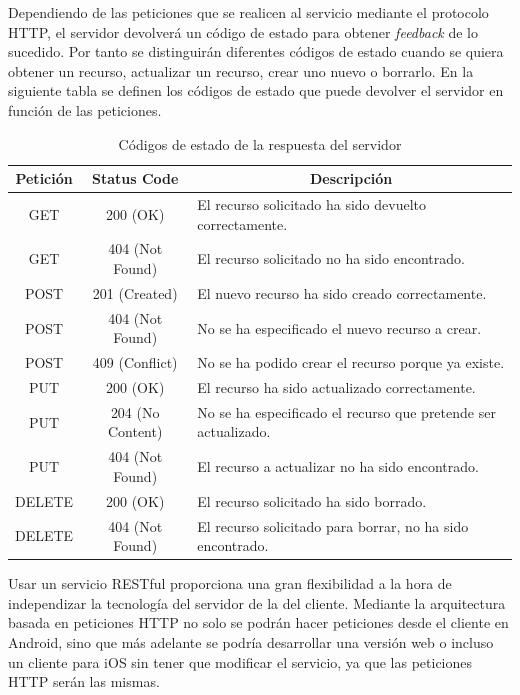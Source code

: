 Dependiendo de las peticiones que se realicen al servicio mediante el protocolo HTTP, el servidor devolverá un código de estado para obtener \textit{feedback} de lo sucedido. Por tanto se distinguirán diferentes códigos de estado cuando se quiera obtener un recurso, actualizar un recurso, crear uno nuevo o borrarlo. En la siguiente tabla se definen los códigos de estado que puede devolver el servidor en función de las peticiones.

\begin{table}[!]
\begin{tabular}{|c|c|m{7.5cm}|}
\hline
{\bf Petición} & {\bf Status Code} & \multicolumn{1}{c|}{{\bf Descripción}}                         \\ \hline
GET            & 200 (OK)          & El recurso solicitado ha sido devuelto correctamente.          \\ \hline
GET            & 404 (Not Found)   & El recurso solicitado no ha sido encontrado.                   \\ \hline
POST           & 201 (Created)     & El nuevo recurso ha sido creado correctamente.                 \\ \hline
POST           & 404 (Not Found)   & No se ha especificado el nuevo recurso a crear.                \\ \hline
POST           & 409 (Conflict)    & No se ha podido crear el recurso porque ya existe.             \\ \hline
PUT            & 200 (OK)          & El recurso ha sido actualizado correctamente.                  \\ \hline
PUT            & 204 (No Content)  & No se ha especificado el recurso que pretende ser actualizado. \\ \hline
PUT            & 404 (Not Found)   & El recurso a actualizar no ha sido encontrado.                 \\ \hline
DELETE         & 200 (OK)          & El recurso solicitado ha sido borrado.                         \\ \hline
DELETE         & 404 (Not Found)   & El recurso solicitado para borrar, no ha sido encontrado.      \\ \hline
\end{tabular}
\caption{Códigos de estado de la respuesta del servidor}
\label{fig:codeStateRestTable}
\end{table}

Usar un servicio RESTful proporciona una gran flexibilidad a la hora de independizar la tecnología del servidor de la del cliente. Mediante la arquitectura basada en peticiones HTTP no solo se podrán hacer peticiones desde el cliente en Android, sino que más adelante se podría desarrollar una versión web o incluso un cliente para iOS sin tener que modificar el servicio, ya que las peticiones HTTP serán las mismas.


